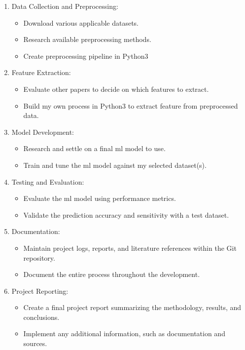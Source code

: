 \documentclass[12pt]{article}
\begin{document}
\begin{enumerate}
    \item Data Collection and Preprocessing:
    \begin{itemize}
        \item Download various applicable datasets.
        \item Research available preprocessing methods.
        \item Create preprocessing pipeline in Python3
    \end{itemize}
    
    \item Feature Extraction:
    \begin{itemize}
        \item Evaluate other papers to decide on which features to extract.
        \item Build my own process in Python3 to extract feature from preprocessed data.
    \end{itemize}
    
    \item Model Development:
    \begin{itemize}
        \item Research and settle on a final \acrshort{ml} model to use.
        \item Train and tune the \acrshort{ml} model against my selected dataset(s).
    \end{itemize}
    
    \item Testing and Evaluation:
    \begin{itemize}
        \item Evaluate the \acrshort{ml} model using performance metrics.
        \item Validate the prediction accuracy and sensitivity with a test dataset.
    \end{itemize}
    
    \item Documentation:
    \begin{itemize}
        \item Maintain project logs, reports, and literature references within the Git repository.
        \item Document the entire process throughout the development.
    \end{itemize}
    
    \item Project Reporting:
    \begin{itemize}
        \item Create a final project report summarizing the methodology, results, and conclusions.
        \item Implement any additional information, such as documentation and sources.
    \end{itemize}
\end{enumerate}
\end{document}
